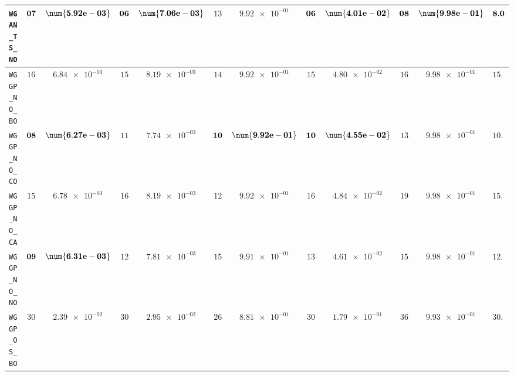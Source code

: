 \begin{table}[H]
\begin{tabularx}{\textwidth}{l||cC|cC|cC|cC|cC||c}
		\texttt{WGAN\_TS\_NO} & $\bf 07$ & $\bf \num{5.92e-03}$ & $\bf 06$ & $\bf \num{7.06e-03}$ & $ 13$ & $ \num{9.92e-01}$ & $\bf 06$ & $\bf \num{4.01e-02}$ & $\bf 08$ & $\bf \num{9.98e-01}$ & $\bf 8.0$  \\ \hline
		\texttt{WGGP\_NO\_BO} & $ 16$ & $ \num{6.84e-03}$ & $ 15$ & $ \num{8.19e-03}$ & $ 14$ & $ \num{9.92e-01}$ & $ 15$ & $ \num{4.80e-02}$ & $ 16$ & $ \num{9.98e-01}$ & $ 15.2$  \\
		\texttt{WGGP\_NO\_CO} & $\bf 08$ & $\bf \num{6.27e-03}$ & $ 11$ & $ \num{7.74e-03}$ & $\bf 10$ & $\bf \num{9.92e-01}$ & $\bf 10$ & $\bf \num{4.55e-02}$ & $ 13$ & $ \num{9.98e-01}$ & $ 10.4$  \\
		\texttt{WGGP\_NO\_CA} & $ 15$ & $ \num{6.78e-03}$ & $ 16$ & $ \num{8.19e-03}$ & $ 12$ & $ \num{9.92e-01}$ & $ 16$ & $ \num{4.84e-02}$ & $ 19$ & $ \num{9.98e-01}$ & $ 15.6$  \\
		\texttt{WGGP\_NO\_NO} & $\bf 09$ & $\bf \num{6.31e-03}$ & $ 12$ & $ \num{7.81e-03}$ & $ 15$ & $ \num{9.91e-01}$ & $ 13$ & $ \num{4.61e-02}$ & $ 15$ & $ \num{9.98e-01}$ & $ 12.8$  \\
		\texttt{WGGP\_OS\_BO} & $ 30$ & $ \num{2.39e-02}$ & $ 30$ & $ \num{2.95e-02}$ & $ 26$ & $ \num{8.81e-01}$ & $ 30$ & $ \num{1.79e-01}$ & $ 36$ & $ \num{9.93e-01}$ & $ 30.4$  \\

\end{tabularx}
\end{table}
